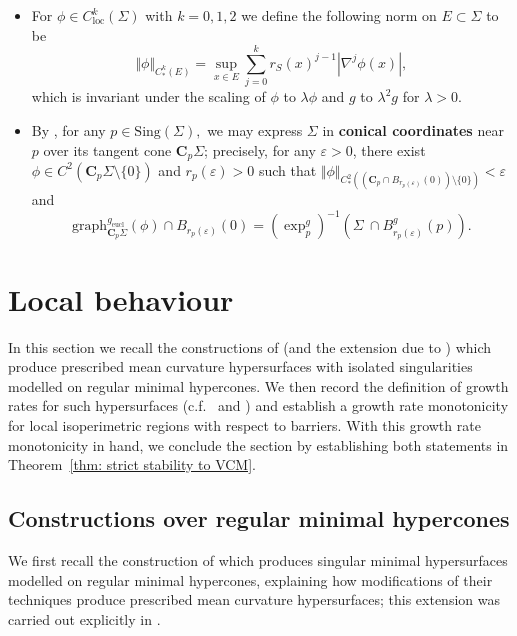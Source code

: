 \documentclass[12pt]{article}
\begin{document}
\begin{itemize}
    \item For $\phi\in C_{\mathrm{loc}}^k(\Sigma)$ with $k = 0,1,2$ we define the following norm on $E \subset \Sigma$ to be
        $$\Vert \phi\Vert_{C^k_*(E)}= \sup_{x \in E} \sum_{j=0}^k r_S(x)^{j-1}|\nabla^j \phi(x)|,$$
    which is invariant under the scaling of $\phi$ to $\lambda \phi$ and $g$ to $\lambda^2g$ for $\lambda > 0$.
 
    
    \item By \cite[Theorem 5]{S83B}, for any $p\in \mathrm{Sing}(\Sigma),$ we may express $\Sigma$ in \textbf{conical coordinates} near $p$ over its tangent cone $\mathbf{C}_p\Sigma$; precisely, for any $\varepsilon >0$, there exist $\phi\in C^2(\mathbf{C}_p\Sigma \setminus \{0\})$ and $r_p(\varepsilon)>0$ such that $\Vert \phi\Vert_{C_*^2((\mathbf{C}_p \cap B_{r_p(\varepsilon)}(0)) \setminus \{0\})}< \varepsilon$ and
    $$ \mathrm{graph}^{g_\mathrm{eucl}}_{\mathbf{C}_p\Sigma} (\phi)\cap 
    B_{r_p(\varepsilon)}(0) = (\exp_p^g)^{-1}\left(\Sigma\ \cap B^g_{r_p(\varepsilon)}(p)\right).$$ 
\end{itemize}


\section{Local behaviour}\label{sec: local behaviour}

In this section we recall the constructions of \cite{CHS84} (and the extension due to \cite{I17}) which produce prescribed mean curvature hypersurfaces with isolated singularities modelled on regular minimal hypercones. We then record the definition of growth rates for such hypersurfaces (c.f.~\cite{MNP25} and \cite{LW25}) and establish a growth rate monotonicity for local isoperimetric regions with respect to barriers. With this growth rate monotonicity in hand, we conclude the section by establishing both statements in Theorem~\ref{thm: strict stability to VCM}.

\subsection{Constructions over regular minimal hypercones}

We first recall the construction of \cite{CHS84} which produces singular minimal hypersurfaces modelled on regular minimal hypercones, explaining how modifications of their techniques produce prescribed mean curvature hypersurfaces; this extension was carried out explicitly in \cite{I17}.
\end{document}
